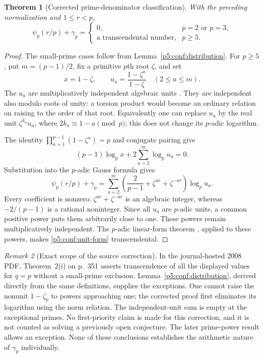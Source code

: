 \documentclass[11pt,a4paper]{article}
\newtheorem{theorem}{Theorem}[section]
\theoremstyle{definition}
\theoremstyle{remark}
\newtheorem{remark}[theorem]{Remark}
\numberwithin{equation}{section}
\begin{document}
\begin{theorem}[Corrected prime-denominator classification]
\label{p5:conf:classification}
With the preceding normalization and $1\le r<p$,
\[
 \psi_p(r/p)+\gamma_p=
 \begin{cases}
 0,&p=2\text{ or }p=3,\\
 \text{a transcendental number},&p\ge5.
 \end{cases}
\]
\end{theorem}
\begin{proof}
The small-prime cases follow from Lemma~\ref{p5:conf:distribution}.
For $p\ge5$, put $m=(p-1)/2$, fix a primitive $p$th root $\zeta$,
and set
\[
 x=1-\zeta,\qquad u_a=\frac{1-\zeta^a}{1-\zeta}
 \quad(2\le a\le m).
\]
The $u_a$ are multiplicatively independent algebraic units
\cite[Lemma 14]{p5:conf:MS}.  They are independent also modulo roots
of unity: a torsion product would become an ordinary relation on
raising to the order of that root.  Equivalently one can replace
$u_a$ by the real unit $\zeta^{k_a}u_a$, where
$2k_a\equiv1-a\pmod p$; this does not change its $p$-adic logarithm.

The identity $\prod_{a=1}^{p-1}(1-\zeta^a)=p$ and conjugate pairing
give
\[
 (p-1)\log_p x+2\sum_{a=2}^m\log_p u_a=0.
\]
Substitution into the $p$-adic Gauss formula
\cite[Lemma 11]{p5:conf:MS} gives
\begin{equation}\label{p5:conf:unit-form}
 \psi_p(r/p)+\gamma_p=
 \sum_{a=2}^m\left(\frac2{p-1}+\zeta^{ar}+\zeta^{-ar}\right)
 \log_p u_a.
\end{equation}
Every coefficient is nonzero: $\zeta^{ar}+\zeta^{-ar}$ is an
algebraic integer, whereas $-2/(p-1)$ is a rational noninteger.
Since all $u_a$ are $p$-adic units, a common positive power puts
them arbitrarily close to one.  These powers remain
multiplicatively independent.  The $p$-adic linear-form theorem
\cite[Corollary 13]{p5:conf:MS}, applied to these powers, makes
\eqref{p5:conf:unit-form} transcendental.
\end{proof}

\begin{remark}[Exact scope of the source correction]
In the journal-hosted 2008 PDF, Theorem~2(i) on p.~351 asserts
transcendence of all the displayed values for $q=p$ without a
small-prime exclusion.  Lemma~\ref{p5:conf:distribution}, derived
directly from the same definitions, supplies the exceptions.
One cannot raise the nonunit $1-\zeta_p$ to powers approaching one;
the corrected proof first eliminates its logarithm using the norm
relation.  The independent-unit sum is empty at the exceptional
primes.  No first-priority claim is made for this correction, and
it is not counted as solving a previously open conjecture.
The later prime-power result \cite[Theorem 1.2]{p5:conf:CG} allows
an exception.  None of these conclusions establishes the
arithmetic nature of $\gamma_p$ individually.
\end{remark}
\end{document}
